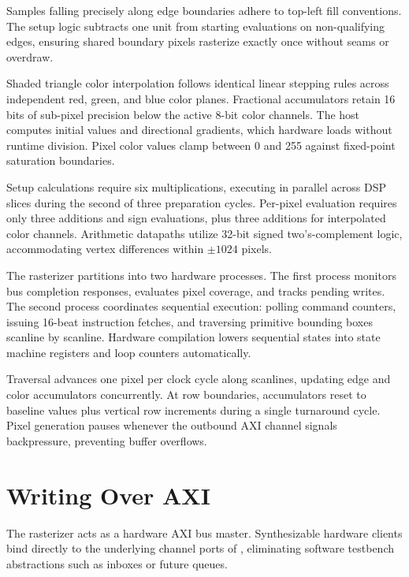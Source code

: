 \documentclass[journal,9pt]{IEEEtran}
\newcommand{\gpupart}[4]{%
}
\begin{document}
Samples falling precisely along edge boundaries adhere to top-left fill
conventions. The setup logic subtracts one unit from starting evaluations on
non-qualifying edges, ensuring shared boundary pixels rasterize exactly once
without seams or overdraw.

Shaded triangle color interpolation follows identical linear stepping rules
across independent red, green, and blue color planes. Fractional accumulators
retain 16 bits of sub-pixel precision below the active 8-bit color channels.
The host computes initial values and directional gradients, which hardware
loads without runtime division. Pixel color values clamp between 0 and 255
against fixed-point saturation boundaries.

\gpupart{raster.rs}{state}{The rasteriser's state.}{lst:g-state}

Setup calculations require six multiplications, executing in parallel across
DSP slices during the second of three preparation cycles. Per-pixel
evaluation requires only three additions and sign evaluations, plus three
additions for interpolated color channels. Arithmetic datapaths utilize
32-bit signed two's-complement logic, accommodating vertex differences
within \(\pm 1024\) pixels.

\gpupart{raster.rs}{run}{The rasteriser execution processes.}{lst:g-run}

The rasterizer partitions into two hardware processes. The first process
monitors bus completion responses, evaluates pixel coverage, and tracks
pending writes. The second process coordinates sequential execution: polling
command counters, issuing 16-beat instruction fetches, and traversing
primitive bounding boxes scanline by scanline. Hardware compilation lowers
sequential states into state machine registers and loop counters
automatically.

Traversal advances one pixel per clock cycle along scanlines, updating edge
and color accumulators concurrently. At row boundaries, accumulators reset to
baseline values plus vertical row increments during a single turnaround cycle.
Pixel generation pauses whenever the outbound AXI channel signals
backpressure, preventing buffer overflows.

\section{Writing Over AXI}
\label{sec:g-axi}

The rasterizer acts as a hardware AXI bus master. Synthesizable hardware
clients bind directly to the underlying channel ports of ,
eliminating software testbench abstractions such as inboxes or future queues.
\end{document}
